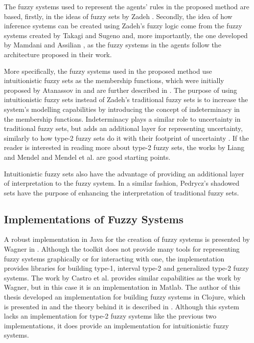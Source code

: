 The fuzzy systems used to represent the agents' rules in the proposed method are
based, firstly, in the ideas of fuzzy sets by Zadeh \cite{Zadeh1965}. Secondly,
the idea of how inference systems can be created using Zadeh's fuzzy logic come
from the fuzzy systems created by Takagi and Sugeno \cite{Takagi1985} and, more
importantly, the one developed by Mamdani and Assilian \cite{Mamdani1975}, as
the fuzzy systems in the agents follow the architecture proposed in their work.

More specifically, the fuzzy systems used in the proposed method use
intuitionistic fuzzy sets as the membership functions, which were initially
proposed by Atanassov in \cite{Atanassov1986} and are further described in
\cite{Atanassov2003}. The purpose of using intuitionistic fuzzy sets instead of
Zadeh's traditional fuzzy sets is to increase the system's modelling
capabilities by introducing the concept of indeterminacy in the membership
functions. Indeterminacy plays a similar role to uncertainty in traditional
fuzzy sets, but adds an additional layer for representing uncertainty, similarly
to how type-2 fuzzy sets do it with their footprint of uncertainty
\cite{Mendel2002} \cite{Karnik2001}. If the reader is interested in reading more
about type-2 fuzzy sets, the works by Liang and Mendel \cite{Liang2000} and
Mendel et al. \cite{Mendel2006} are good starting points.

Intuitionistic fuzzy sets also have the advantage of providing an additional
layer of interpretation to the fuzzy system. In a similar fashion, Pedrycz's
shadowed sets \cite{Pedrycz1998} have the purpose of enhancing the
interpretation of traditional fuzzy sets.

\subsection{Implementations of Fuzzy Systems}
\label{section:implementations-of\fuzzy-systems}

A robust implementation in Java for the creation of fuzzy systems is presented
by Wagner in \cite{Wagner2013}. Although the toolkit does not provide many tools
for representing fuzzy systems graphically or for interacting with one, the
implementation provides libraries for building type-1, interval type-2 and
generalized type-2 fuzzy systems. The work by Castro et
al. \cite{castro2007interval} provides similar capabilities as the work by
Wagner, but in this case it is an implementation in Matlab. The author of this
thesis developed an implementation for building fuzzy systems in Clojure, which
is presented in \cite{Hernandez-Aguila2017} and the theory behind it is
described in \cite{Hernandez-aguila2016}. Although this system lacks an
implementation for type-2 fuzzy systems like the previous two implementations,
it does provide an implementation for intuitionistic fuzzy systems.

